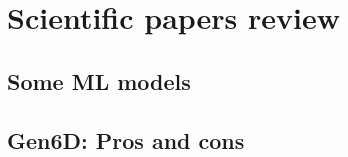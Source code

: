 
\chapter{Scientific papers review}\label{chapter:scientific_papers_review}

\section{Some ML models}
\section{Gen6D: Pros and cons}